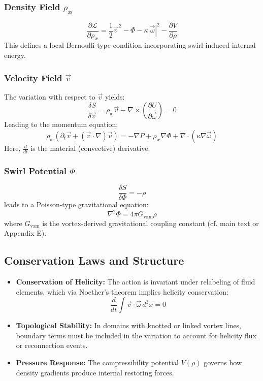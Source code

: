 \subsubsection*{Density Field $\rho_\text{\ae}$}
\begin{equation}
    \frac{\partial \mathcal{L}}{\partial \rho_\text{\ae}} = \frac{1}{2} \vec{v}^{\,2} - \Phi - \kappa |\vec{\omega}|^2 - \frac{\partial V}{\partial \rho}
\end{equation}
This defines a local Bernoulli-type condition incorporating swirl-induced internal energy.

\subsubsection*{Velocity Field $\vec{v}$}
The variation with respect to $\vec{v}$ yields:
\begin{equation}
    \frac{\delta S}{\delta \vec{v}} = \rho_\text{\ae}\vec{v} - \nabla \times \left( \frac{\partial U}{\partial \vec{\omega}} \right) = 0
\end{equation}
Leading to the momentum equation:
\begin{equation}
    \rho_\text{\ae}\left( \partial_t \vec{v} + (\vec{v} \cdot \nabla)\vec{v} \right) = -\nabla P + \rho_\text{\ae}\nabla \Phi + \nabla \cdot \left( \kappa \nabla \vec{\omega} \right)
\end{equation}
Here, $\frac{d}{dt}$ is the material (convective) derivative.

\subsubsection*{Swirl Potential $\Phi$}
\begin{equation}
    \frac{\delta S}{\delta \Phi} = -\rho
\end{equation}
leads to a Poisson-type gravitational equation:
\begin{equation}
    \nabla^2 \Phi = 4\pi G_{\mathrm{vam}} \rho
\end{equation}
where $G_{\mathrm{vam}}$ is the vortex-derived gravitational coupling constant (cf. main text or Appendix E).

\subsection*{Conservation Laws and Structure}
\begin{itemize}
    \item \textbf{Conservation of Helicity:}
    The action is invariant under relabeling of fluid elements, which via Noether’s theorem implies helicity conservation:
    \[
        \frac{d}{dt} \int \vec{v} \cdot \vec{\omega} \, d^3x = 0
    \]
    \item \textbf{Topological Stability:} In domains with knotted or linked vortex lines, boundary terms must be included in the variation to account for helicity flux or reconnection events.
    \item \textbf{Pressure Response:} The compressibility potential $V(\rho)$ governs how density gradients produce internal restoring forces.
\end{itemize}


